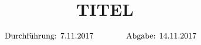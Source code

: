 

\subject{VERSUCH NUMMER}
\title{TITEL}

\date{
  \begin{align}
    \text{Durchführung: } & \text{7.11.2017} & \hspace{3em} & \text{Abgabe: 14.11.2017} \notag
  \end{align}
}




\maketitle
\thispagestyle{empty}
\tableofcontents
\newpage






\nocite{*}
\printbibliography{}


